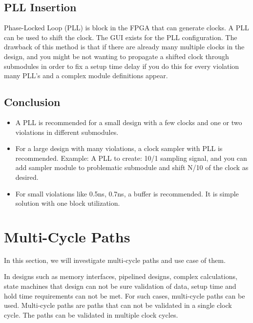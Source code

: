 \documentclass{report}
\begin{document}
\subsection{PLL Insertion}
Phase-Locked Loop (PLL) is block in the FPGA that can generate clocks.
A PLL can be used to shift the clock. The GUI exists for the PLL configuration. The drawback of this method is that if there are already many multiple clocks in the design, and you might be not wanting to propagate a shifted clock through submodules in order to fix a setup time delay if you do this for every violation many PLL's and a complex module definitions appear.

\subsection{Conclusion}
\begin{itemize}
    \item A PLL is recommended for a small design with a few clocks and one or two violations in different submodules.
    \item For a large design with many violations, a clock sampler with PLL is recommended. Example: A PLL to create: 10/1 sampling signal, and you can add sampler module to problematic submodule and shift N/10 of the clock as desired.
    \item For small violations like 0.5ns, 0.7ns, a buffer is recommended. It is simple solution with one block utilization.
\end{itemize}
\section{Multi-Cycle Paths}
In this section, we will investigate multi-cycle paths and use case of them.

In designs such as memory interfaces, pipelined designs, complex calculations, state machines that design can not be sure validation of data, setup time and hold time requirements can not be met. For such cases, multi-cycle paths can be used. Multi-cycle paths are paths that can not be validated in a single clock cycle. The paths can be validated in multiple clock cycles.
\end{document}
